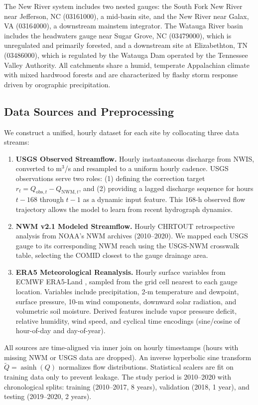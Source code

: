 \documentclass[draft]{agujournal2019}
\begin{document}
The New River system includes two nested gauges: the South Fork New River near Jefferson, NC (03161000), a mid-basin site, and the New River near Galax, VA (03164000), a downstream mainstem integrator. The Watauga River basin includes the headwaters gauge near Sugar Grove, NC (03479000), which is unregulated and primarily forested, and a downstream site at Elizabethton, TN (03486000), which is regulated by the Watauga Dam operated by the Tennessee Valley Authority. All catchments share a humid, temperate Appalachian climate with mixed hardwood forests and are characterized by flashy storm response driven by orographic precipitation.

\subsection{Data Sources and Preprocessing}

We construct a unified, hourly dataset for each site by collocating three data streams:

\begin{enumerate}
    \item \textbf{USGS Observed Streamflow.} Hourly instantaneous discharge from NWIS, converted to m$^{3}$/s and resampled to a uniform hourly cadence. USGS observations serve two roles: (1) defining the correction target $r_t = Q_{\text{obs},t} - Q_{\text{NWM},t}$, and (2) providing a lagged discharge sequence for hours $t{-}168$ through $t{-}1$ as a dynamic input feature. This 168-h observed flow trajectory allows the model to learn from recent hydrograph dynamics.
    \item \textbf{NWM v2.1 Modeled Streamflow.} Hourly CHRTOUT retrospective analysis from NOAA's NWM archives (2010--2020). We mapped each USGS gauge to its corresponding NWM reach using the USGS-NWM crosswalk table, selecting the COMID closest to the gauge drainage area.
    \item \textbf{ERA5 Meteorological Reanalysis.} Hourly surface variables from ECMWF ERA5-Land \cite{hersbach2020}, sampled from the grid cell nearest to each gauge location. Variables include precipitation, 2-m temperature and dewpoint, surface pressure, 10-m wind components, downward solar radiation, and volumetric soil moisture. Derived features include vapor pressure deficit, relative humidity, wind speed, and cyclical time encodings (sine/cosine of hour-of-day and day-of-year).
\end{enumerate}

All sources are time-aligned via inner join on hourly timestamps (hours with missing NWM or USGS data are dropped). An inverse hyperbolic sine transform $\tilde{Q} = \operatorname{asinh}(Q)$ normalizes flow distributions. Statistical scalers are fit on training data only to prevent leakage. The study period is 2010--2020 with chronological splits: training (2010--2017, 8 years), validation (2018, 1 year), and testing (2019--2020, 2 years).
\end{document}
